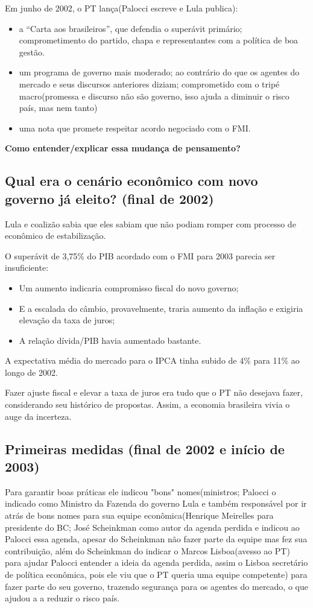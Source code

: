 \documentclass[a4paper,12pt]{article}[abntex2]
\begin{document}
Em junho de 2002, o PT lança(Palocci escreve e Lula publica):
\begin{itemize}
    \item a ``Carta aos brasileiros'', que defendia o superávit primário; comprometimento do partido, chapa e representantes com a política de boa gestão.
    \item um programa de governo mais moderado; ao contrário do que os agentes do mercado e seus discursos anteriores diziam; comprometido com o tripé macro(promessa e discurso não são governo, isso ajuda a diminuir o risco país, mas nem tanto)
    \item uma nota que promete respeitar acordo negociado com o FMI.
\end{itemize}

\textbf{Como entender/explicar essa mudança de pensamento?}

\subsection{\textbf{Qual era o cenário econômico com novo governo já eleito? (final de 2002)}}

Lula e coalizão sabia que eles sabiam que não podiam romper com processo de econômico de estabilização. 

O superávit de 3,75\% do PIB acordado com o FMI para 2003 parecia ser insuficiente:

\begin{itemize}
    \item Um aumento indicaria compromisso fiscal do novo governo;
    \item E a escalada do câmbio, provavelmente, traria aumento da inflação e exigiria elevação da taxa de juros;
    \item A relação dívida/PIB havia aumentado bastante.
\end{itemize}

A expectativa média do mercado para o IPCA tinha subido de 4\% para 11\% ao longo de 2002.

Fazer ajuste fiscal e elevar a taxa de juros era tudo que o PT não desejava fazer, considerando seu histórico de propostas.  
Assim, a economia brasileira vivia o auge da incerteza.

\subsection{\textbf{Primeiras medidas (final de 2002 e início de 2003)}}
Para garantir boas práticas ele indicou "bons" nomes(ministros; Palocci o indicado como Ministro da Fazenda do governo Lula e também responsável por ir atrás de bons nomes para sua equipe econômica(Henrique Meirelles para presidente do BC; José Scheinkman como autor da agenda perdida e indicou ao Palocci essa agenda, apesar do Scheinkman não fazer parte da equipe mas fez sua contribuição, além do Scheinkman do indicar o Marcos Lisboa(avesso ao PT) para ajudar Palocci entender a ideia da agenda perdida, assim o Lisboa secretário de política econômica, pois ele viu que o PT queria uma equipe competente) para fazer parte do seu governo, trazendo segurança para os agentes do mercado, o que ajudou a a reduzir o risco país.
\end{document}
